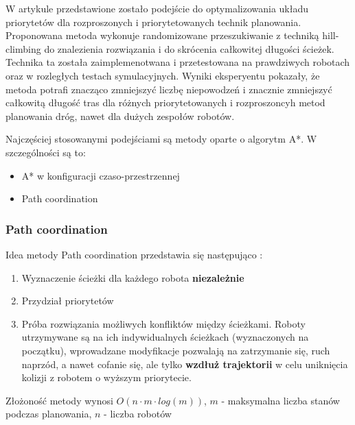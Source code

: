 W artykule \cite{optpriorities} przedstawione zostało podejście do optymalizowania układu priorytetów dla rozproszonych i priorytetowanych technik planowania.
Proponowana metoda wykonuje randomizowane przeszukiwanie z techniką hill-climbing do znalezienia rozwiązania i do skrócenia całkowitej długości ścieżek.
Technika ta została zaimplemenotwana i przetestowana na prawdziwych robotach oraz w rozległych testach symulacyjnych.
Wyniki eksperyentu pokazały, że metoda potrafi znacząco zmniejszyć liczbę niepowodzeń i znacznie zmniejszyć całkowitą długość tras dla różnych priorytetowanych i rozproszoncyh metod planowania dróg, nawet dla dużych zespołów robotów.

Najczęściej stosowanymi podejściami są metody oparte o algorytm A*. W szczególności są to:
\begin{itemize}
	\item A* w konfiguracji czaso-przestrzennej
	\item Path coordination
\end{itemize}

\subsubsection{Path coordination}
Idea metody Path coordination przedstawia się następująco \cite{optpriorities}:
\begin{enumerate}
	\item Wyznaczenie ścieżki dla każdego robota {\bf niezależnie}
	\item Przydział priorytetów
	\item Próba rozwiązania możliwych konfliktów między ścieżkami. Roboty utrzymywane są na ich indywidualnych ścieżkach (wyznaczonych na początku), wprowadzane modyfikacje pozwalają na zatrzymanie się, ruch naprzód, a nawet cofanie się, ale tylko {\bf wzdłuż trajektorii} w celu uniknięcia kolizji z robotem o wyższym priorytecie.
\end{enumerate}
Złożoność metody wynosi $O(n \cdot m \cdot log(m))$, $m$ - maksymalna liczba stanów podczas planowania, $n$ - liczba robotów


